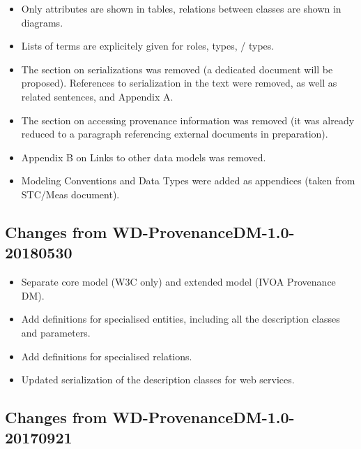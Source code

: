 \begin{itemize}
\item Only attributes are shown in tables, relations between classes are shown in diagrams.
\item Lists of terms are explicitely given for  roles,  types, / types.
\item The section on serializations was removed (a dedicated document will be proposed). References to serialization in the text were removed, as well as related sentences, and Appendix A.
\item The section on accessing provenance information was removed (it was already reduced to a paragraph referencing external documents in preparation).
\item Appendix B on Links to other data models was removed.
\item Modeling Conventions and Data Types were added as appendices (taken from STC/Meas document).
\end{itemize}


\subsection{Changes from WD-ProvenanceDM-1.0-20180530}

\begin{itemize}
\item Separate core model (W3C only) and extended model (IVOA Provenance DM).
\item Add definitions for specialised entities, including all the description classes and parameters.
\item Add definitions for specialised relations.
\item Updated serialization of the description classes for web services.
\end{itemize}


\subsection{Changes from WD-ProvenanceDM-1.0-20170921}

